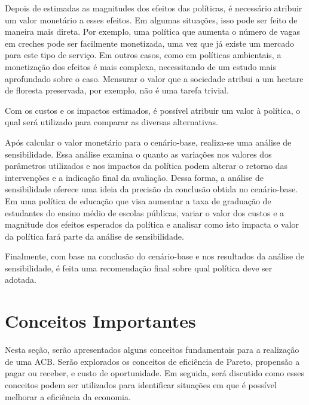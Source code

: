\documentclass[12pt,letterpaper]{article}
\newcommand{\1}{\mathbbm{1}}
\numberwithin{equation}{section}
\begin{document}
Depois de estimadas as magnitudes dos efeitos das políticas, é necessário atribuir um valor monetário a esses efeitos. Em algumas situações, isso pode ser feito de maneira mais direta. Por exemplo, uma política que aumenta o número de vagas em creches pode ser facilmente monetizada, uma vez que já existe um mercado para este tipo de serviço. Em outros casos, como em políticas ambientais, a monetização dos efeitos é mais complexa, necessitando de um estudo mais aprofundado sobre o caso. Mensurar o valor que a sociedade atribui a um hectare de floresta preservada, por exemplo, não é uma tarefa trivial.


Com os custos e os impactos estimados, é possível atribuir um valor à política, o qual será utilizado para comparar as diversas alternativas.

Após calcular o valor monetário para o cenário-base, realiza-se uma análise de sensibilidade. Essa análise examina o quanto as variações nos valores dos parâmetros utilizados e nos impactos da política podem alterar o retorno das intervenções e a indicação final da avaliação. Dessa forma, a análise de sensibilidade oferece uma ideia da precisão da conclusão obtida no cenário-base. Em uma política de educação que visa aumentar a taxa de graduação de estudantes do ensino médio de escolas públicas, variar o valor dos custos e a magnitude dos efeitos esperados da política e analisar como isto impacta o valor da política fará parte da análise de sensibilidade.

Finalmente, com base na conclusão do cenário-base e nos resultados da análise de sensibilidade, é feita uma recomendação final sobre qual política deve ser adotada.

\section{Conceitos Importantes}
\label{sec:conceitos}

Nesta seção, serão apresentados alguns conceitos fundamentais para a realização de uma ACB. Serão explorados os conceitos de eficiência de Pareto, propensão a pagar ou receber, e custo de oportunidade. Em seguida, será discutido como esses conceitos podem ser utilizados para identificar situações em que é possível melhorar a eficiência da economia.
\end{document}
